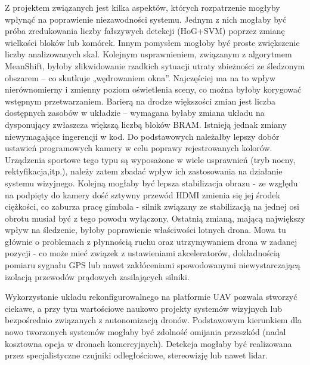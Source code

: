 Z projektem związanych jest kilka aspektów, których rozpatrzenie mogłyby wpłynąć na poprawienie niezawodności systemu. Jednym z nich mogłaby być próba zredukowania liczby fałszywych detekcji (HoG+SVM) poprzez zmianę wielkości bloków lub komórek. %
Innym pomysłem mogłoby być proste zwiększenie liczby analizowanych skal. %
Kolejnym usprawnieniem, związanym z algorytmem MeanShift, byłoby zlikwidowanie rzadkich sytuacji utraty zbieżności ze śledzonym obszarem -- co skutkuje „wędrowaniem okna”. Najczęściej ma na to wpływ nierównomierny i zmienny poziom oświetlenia sceny, co można byłoby korygować wstępnym przetwarzaniem. %
Barierą na drodze większości zmian jest liczba dostępnych zasobów w układzie -- wymagana byłaby zmiana układu na dysponujący zwłaszcza większą liczbą bloków BRAM. 
Istnieją jednak zmiany niewymagające ingerencji w kod. 
Do podstawowych należałby lepszy dobór ustawień programowych kamery w celu poprawy rejestrowanych kolorów. Urządzenia sportowe tego typu są wyposażone w wiele usprawnień (tryb nocny, rektyfikacja,itp.), należy zatem zbadać wpływ ich zastosowania na działanie systemu wizyjnego. %
Kolejną mogłaby być lepsza stabilizacja obrazu - ze względu na podpięty do kamery dość sztywny przewód HDMI zmienia się jej środek ciężkości, co zaburza pracę gimbala - silnik związany ze stabilizacją na jednej osi obrotu musiał być z tego powodu wyłączony. %
Ostatnią zmianą, mającą największy wpływ na śledzenie, byłoby poprawienie właściwości lotnych drona. Mowa tu głównie o problemach z płynnością ruchu oraz utrzymywaniem drona w zadanej pozycji - co może mieć związek z ustawieniami akceleratorów,  dokładnością pomiaru sygnału GPS lub nawet zakłóceniami spowodowanymi niewystarczającą izolacją przewodów prądowych zasilających silniki.%

Wykorzystanie układu rekonfigurowalnego na platformie UAV pozwala stworzyć ciekawe, a przy tym wartościowe naukowo projekty systemów wizyjnych lub bezpośrednio związanych z autonomizacją dronów.
Podstawowym kierunkiem dla nowo tworzonych systemów mogłaby być zdolność omijania przeszkód (nadal kosztowna opcja w dronach komercyjnych). Detekcja mogłaby być realizowana przez specjalistyczne czujniki odległościowe, stereowizję lub nawet lidar. %




